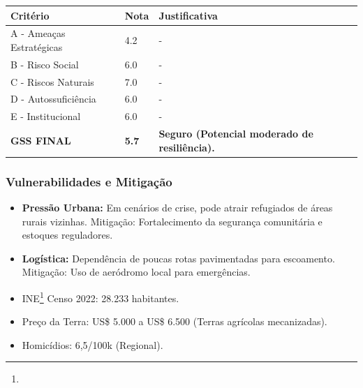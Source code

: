 \begin{table}[ht!]
\small \begin{tabular}{p{3.0cm}p{0.8cm}p{6.0cm}} \toprule
\textbf{Critério} & \textbf{Nota} & \textbf{Justificativa} \\ \midrule
A - Ameaças Estratégicas & 4.2 & - \\
B - Risco Social & 6.0 & - \\
C - Riscos Naturais & 7.0 & - \\
D - Autossuficiência & 6.0 & - \\
E - Institucional & 6.0 & - \\
\midrule \textbf{GSS FINAL} & \textbf{5.7} & \textbf{Seguro (Potencial moderado de resiliência).} \\ \bottomrule \end{tabular}
\end{table}
\subsubsection{Vulnerabilidades e
Mitigação}

\begin{itemize}
\item
  \textbf{Pressão Urbana:} Em cenários de crise, pode atrair refugiados
  de áreas rurais vizinhas. Mitigação: Fortalecimento da segurança
  comunitária e estoques reguladores.
\item
  \textbf{Logística:} Dependência de poucas rotas pavimentadas para
  escoamento. Mitigação: Uso de aeródromo local para emergências.
\item
  INE\footnote{\fineINE} Censo 2022: 28.233 habitantes.
\item
  Preço da Terra: US\$ 5.000 a US\$ 6.500 (Terras agrícolas
  mecanizadas).
\item
  Homicídios: 6,5/\allowbreak 100k (Regional).
\end{itemize}
